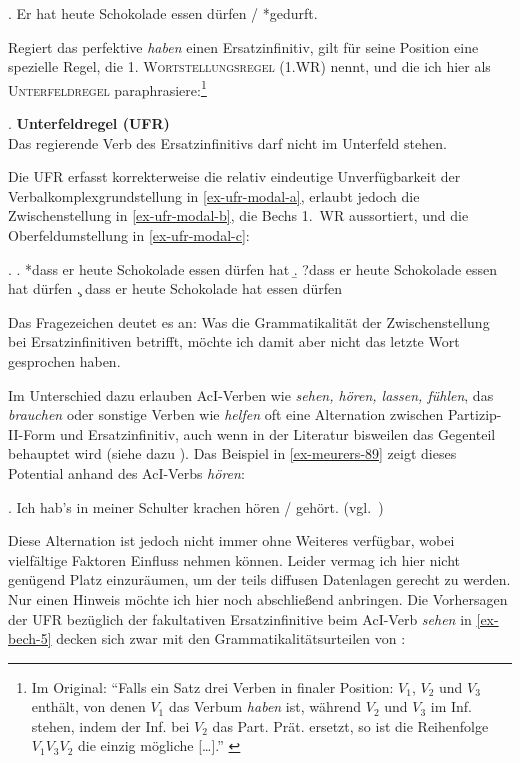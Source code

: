 \ex. Er hat heute Schokolade essen dürfen / *gedurft. \hfill \citep[(82)]{Meurers:99} 

Regiert das perfektive {\it haben} einen Ersatzinfinitiv, gilt für seine Position eine spezielle Regel, die \cite{Bech:63}  \textsc{1. Wortstellungsregel (1.WR)} nennt, und die ich hier als \textsc{Unterfeldregel} paraphrasiere:\footnote{Im Original: "`Falls ein Satz drei Verben in finaler Position: $V_1$, $V_2$ und $V_3$ enthält, von denen $V_1$ das Verbum {\it haben} ist, während $V_2$ und $V_3$ im Inf. stehen, indem der Inf. bei $V_2$ das Part. Prät. ersetzt, so ist die Reihenfolge $V_1 V_3 V_2$ die einzig mögliche [\ldots]."' \citep[\S 10]{Bech:63}} 

\ex. {\bf Unterfeldregel (UFR)} \label{ex-ufr}\\
Das regierende Verb des Ersatzinfinitivs darf nicht im Unterfeld stehen.

Die UFR erfasst korrekterweise die relativ eindeutige Unverfügbarkeit der Verbalkomplexgrundstellung in \ref{ex-ufr-modal-a}, erlaubt jedoch die Zwischenstellung in \ref{ex-ufr-modal-b}, die Bechs 1.~WR aussortiert, und die Oberfeldumstellung in \ref{ex-ufr-modal-c}:

\ex. 
\a. *dass er heute Schokolade essen dürfen hat \label{ex-ufr-modal-a}
\b. ?dass er heute Schokolade essen hat dürfen \label{ex-ufr-modal-b}
\c. dass er heute Schokolade hat essen dürfen \label{ex-ufr-modal-c}

Das Fragezeichen deutet es an: Was die Grammatikalität der Zwischenstellung bei Ersatzinfinitiven betrifft, möchte ich damit aber nicht das letzte Wort gesprochen haben.

Im Unterschied dazu erlauben AcI-Verben wie {\it sehen, hören, lassen, fühlen}, das  {\it brauchen} oder sonstige Verben wie {\it helfen} oft eine Alternation zwischen Partizip-II-Form und Ersatzinfinitiv, auch wenn in der Literatur bisweilen das Gegenteil behauptet wird (siehe dazu \citealt[55ff]{Meurers:99}). Das Beispiel in \ref{ex-meurers-89} zeigt dieses Potential anhand des AcI-Verbs {\it hören}: 

\ex. Ich hab's in meiner Schulter krachen hören / gehört. \hfill (vgl.\ \citealt[(89a)]{Meurers:99})\label{ex-meurers-89}

Diese Alternation ist jedoch nicht immer ohne Weiteres verfügbar, wobei vielfältige Faktoren Einfluss nehmen können. Leider vermag ich hier nicht genügend Platz einzuräumen, um der teils diffusen Datenlagen gerecht zu werden. Nur einen Hinweis möchte ich hier noch abschlie\ss end anbringen. Die Vorhersagen der UFR bezüglich der fakultativen Ersatzinfinitive beim AcI-Verb {\it sehen} in \ref{ex-bech-5}  decken sich zwar mit den Grammatikalitätsurteilen von \cite{Bech:63}:

